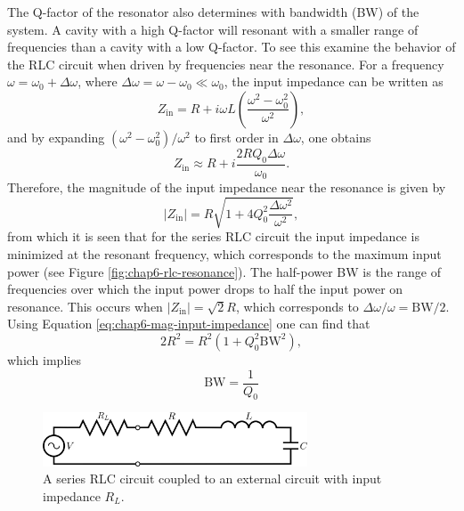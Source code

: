 The Q-factor of the resonator also determines with bandwidth (BW) of the system. A cavity with a high Q-factor will resonant with a smaller range of frequencies than a cavity with a low Q-factor. To see this examine the behavior of the RLC circuit when driven by frequencies near the resonance. For a frequency $\omega=\omega_0+\Delta \omega$, where $\Delta \omega=\omega-\omega_0\ll \omega_0$, the input impedance can be written as
\begin{equation}
    Z_\mathrm{in}=R+i\omega L\left(\frac{\omega^2-\omega_0^2}{\omega^2}\right),
\end{equation}
and by expanding $(\omega^2-\omega_0^2)/\omega^2$ to first order in $\Delta\omega$, one obtains 
\begin{equation}
    Z_\mathrm{in}\approx R+i\frac{2RQ_0\Delta\omega}{\omega_0}.
\end{equation}
Therefore, the magnitude of the input impedance near the resonance is given by 
\begin{equation}
    |Z_\mathrm{in}|=R\sqrt{1+4Q_0^2\frac{\Delta\omega^2}{\omega^2}}, 
    \label{eq:chap6-mag-input-impedance}
\end{equation}
from which it is seen that for the series RLC circuit the input impedance is minimized at the resonant frequency, which corresponds to the maximum input power (see Figure \ref{fig:chap6-rlc-resonance}). The half-power BW is the range of frequencies over which the input power drops to half the input power on resonance. This occurs when $|Z_\mathrm{in}|=\sqrt{2}R$, which corresponds to $\Delta\omega/\omega=\textrm{BW}/2$. Using Equation \ref{eq:chap6-mag-input-impedance} one can find that
\begin{equation}
    2R^2=R^2(1+Q_0^2\mathrm{BW}^2),
\end{equation}
which implies
\begin{equation}
    \mathrm{BW}=\frac{1}{Q_0}
\end{equation}

\begin{figure}[htbp]
    \centering
    \includegraphics*[width=0.7\textwidth]{figs/Chapter-6/230607_loaded_rlc.png}
    \caption{\label{fig:chap6-loaded-resonator-circuit} A series RLC circuit coupled to an external circuit with input impedance $R_L$.}
\end{figure}

